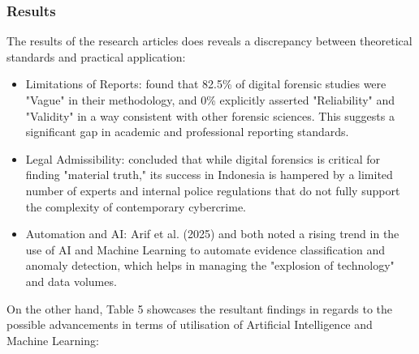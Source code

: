 \documentclass[12pt,a4paper]{article}
\begin{document}
\subsubsection{Results}
The results of the research articles does reveals a discrepancy between theoretical standards and practical application:
\begin{itemize}
\item Limitations of Reports: \cite{sharma2024digital} found that 82.5\% of digital forensic studies were "Vague" in their methodology, and 0\% explicitly asserted "Reliability" and "Validity" in a way consistent with other forensic sciences. This suggests a significant gap in academic and professional reporting standards.
\item Legal Admissibility: \cite{ilyas2024role} concluded that while digital forensics is critical for finding "material truth," its success in Indonesia is hampered by a limited number of experts and internal police regulations that do not fully support the complexity of contemporary cybercrime.
\item Automation and AI: Arif et al. (2025) and \cite{hassan2025} both noted a rising trend in the use of AI and Machine Learning to automate evidence classification and anomaly detection, which helps in managing the "explosion of technology" and data volumes.
\end{itemize}

On the other hand, Table 5 showcases the resultant findings in regards to the possible advancements in terms of utilisation of Artificial Intelligence and Machine Learning:
\end{document}
